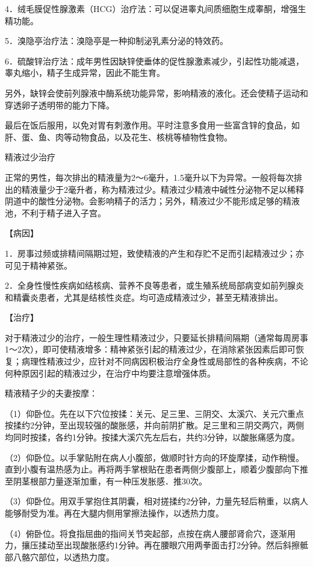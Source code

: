 \documentclass[12pt,UTF8,openany]{ctexbook}
\begin{document}
4．绒毛膜促性腺激素（HCG）治疗法：可以促进睾丸间质细胞生成睾酮，增强生精功能。

5．溴隐亭治疗法：溴隐亭是一种抑制泌乳素分泌的特效药。

6．硫酸锌治疗法：成年男性因缺锌使垂体的促性腺激素减少，引起性功能减退，睾丸缩小，精子生成异常，因此不能生育。

另外，缺锌会使前列腺液中酶系统功能异常，影响精液的液化。还会使精子运动和穿透卵子透明带的能力下降。

最后在饭后服用，以免对胃有刺激作用。平时注意多食用一些富含锌的食品，如肝、蛋、鱼、肉等动物食品，以及花生、核桃等植物性食物。





精液过少治疗


正常的男性，每次排出的精液量为2～6毫升，1.5毫升以下为异常。一般将每次排出的精液量少于2毫升者，称为精液过少。精液过少精液中碱性分泌物不足以稀释阴道中的酸性分泌物。会影响精子的活力；另外，精液过少不能形成足够的精液池，不利于精子进入子宫。

【病因】

1．房事过频或排精间隔期过短，致使精液的产生和存贮不足而引起精液过少；亦可见于精神紧张。

2．全身性慢性疾病如结核病、营养不良等患者，或生殖系统局部病变如前列腺炎和精囊炎患者，尤其是结核性炎症。均可造成精液过少，甚至无精液排出。

【治疗】

对于精液过少的治疗，一般生理性精液过少，只要延长排精间隔期（通常每周房事1～2次），即可使精液增多：精神紧张引起的精液过少，在消除紧张因素后即可恢复；病理性精液过少，应针对不同病因积极治疗全身性或局部性的各种疾病，不论何种原因引起的精液过少，在治疗中均要注意增强体质。

精液精子少的夫妻按摩：

（1）仰卧位。先在以下穴位按揉：关元、足三里、三阴交、太溪穴、关元穴重点按揉约2分钟，至出现较强的酸胀感，并向前阴扩散。足三里和三阴交两穴，两侧均同时按揉，各约1分钟。按揉大溪穴先左后右，共约3分钟，以酸胀痛感为度。

（2）仰卧位。以手掌贴附在病人小腹部，做顺时针方向的环旋摩揉，动作稍慢。直到小腹有温热感为止。再将两手掌根贴在患者两侧少腹部上，顺着少腹部向下推至阴茎根部力量逐渐加重，有一种压发胀感．推30次。

（3）仰卧位。用双手掌抱住其阴囊，相对搓揉约2分钟，力量先轻后稍重，以病人能够耐受为准。再在大腿内侧用掌擦法操作，以透热力度。

（4）俯卧位。将食指屈曲的指间关节突起部，点按在病人腰部肾俞穴，逐渐用力，攘压揉动至出现酸胀感约1分钟。再在腰眼穴用两拳面击打2分钟。然后斜擦骶部八骼穴部位，以透热力度。
\end{document}
